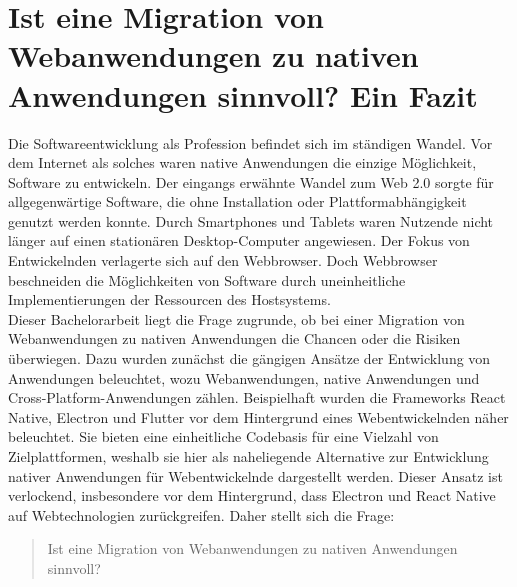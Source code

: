 \documentclass[a4paper]{scrartcl}
\begin{document}
\newpage

\section{Ist eine Migration von Webanwendungen zu nativen Anwendungen sinnvoll? Ein Fazit}
Die Softwareentwicklung als Profession befindet sich im ständigen Wandel. Vor dem Internet als solches waren native Anwendungen die einzige Möglichkeit, Software zu entwickeln. Der eingangs erwähnte Wandel zum Web 2.0 sorgte für allgegenwärtige Software, die ohne Installation oder Plattformabhängigkeit genutzt werden konnte. Durch Smartphones und Tablets waren Nutzende nicht länger auf einen stationären Desktop-Computer angewiesen. Der Fokus von Entwickelnden verlagerte sich auf den Webbrowser. Doch Webbrowser beschneiden die Möglichkeiten von Software durch uneinheitliche Implementierungen der Ressourcen des Hostsystems. \\
Dieser Bachelorarbeit liegt die Frage zugrunde, ob bei einer Migration von Webanwendungen zu nativen Anwendungen die Chancen oder die Risiken überwiegen. Dazu wurden zunächst die gängigen Ansätze der Entwicklung von Anwendungen beleuchtet, wozu Webanwendungen, native Anwendungen und Cross-Platform-Anwendungen zählen. Beispielhaft wurden die Frameworks React Native, Electron und Flutter vor dem Hintergrund eines Webentwickelnden näher beleuchtet. Sie bieten eine einheitliche Codebasis für eine Vielzahl von Zielplattformen, weshalb sie hier als naheliegende Alternative zur Entwicklung nativer Anwendungen für Webentwickelnde dargestellt werden. Dieser Ansatz ist verlockend, insbesondere vor dem Hintergrund, dass Electron und React Native auf Webtechnologien zurückgreifen. Daher stellt sich die Frage: 

\begin{quote}
	Ist eine Migration von Webanwendungen zu nativen Anwendungen sinnvoll?	
\end{quote}
\end{document}
